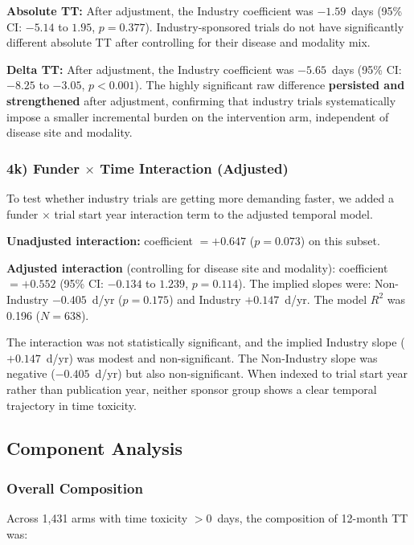 \documentclass[11pt,a4paper]{article}
\begin{document}
\textbf{Absolute TT:} After adjustment, the Industry coefficient was $-1.59$~days (95\% CI: $-5.14$ to $1.95$, $p=0.377$). Industry-sponsored trials do not have significantly different absolute TT after controlling for their disease and modality mix.

\textbf{Delta TT:} After adjustment, the Industry coefficient was $-5.65$~days (95\% CI: $-8.25$ to $-3.05$, $p<0.001$). The highly significant raw difference \textbf{persisted and strengthened} after adjustment, confirming that industry trials systematically impose a smaller incremental burden on the intervention arm, independent of disease site and modality.

\subsubsection{4k) Funder $\times$ Time Interaction (Adjusted)}

To test whether industry trials are getting more demanding faster, we added a funder $\times$ trial start year interaction term to the adjusted temporal model.

\textbf{Unadjusted interaction:} coefficient $=+0.647$ ($p=0.073$) on this subset.

\textbf{Adjusted interaction} (controlling for disease site and modality): coefficient $=+0.552$ (95\% CI: $-0.134$ to $1.239$, $p=0.114$). The implied slopes were: Non-Industry $-0.405$~d/yr ($p=0.175$) and Industry $+0.147$~d/yr. The model $R^2$ was 0.196 ($N=638$).

The interaction was not statistically significant, and the implied Industry slope ($+0.147$~d/yr) was modest and non-significant. The Non-Industry slope was negative ($-0.405$~d/yr) but also non-significant. When indexed to trial start year rather than publication year, neither sponsor group shows a clear temporal trajectory in time toxicity.

\subsection{Component Analysis}
\label{sec:component}

\subsubsection{Overall Composition}

Across 1{,}431 arms with time toxicity $>0$~days, the composition of 12-month TT was:
\end{document}
